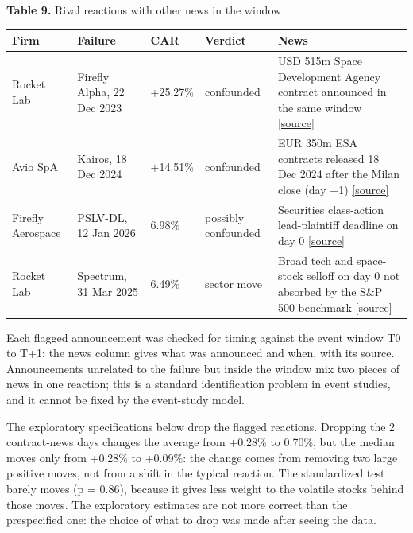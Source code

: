 \documentclass[12pt,a4paper]{article}
\begin{document}
\par\noindent\begin{minipage}{\textwidth}
\textbf{Table 9.} Rival reactions with other news in the window

{\small\setlength{\tabcolsep}{4pt}\begin{tabularx}{\textwidth}{lXllX}
\toprule
\textbf{Firm} & \textbf{Failure} & \textbf{CAR} & \textbf{Verdict} & \textbf{News} \\
\midrule
Rocket Lab & Firefly Alpha, 22 Dec 2023 & +25.27\% & confounded & USD 515m Space Development Agency contract announced in the same window \href{https://www.fool.com/investing/2023/12/22/why-rocket-lab-stock-is-going-to-the-moon-today}{[source]} \\
Avio SpA & Kairos, 18 Dec 2024 & +14.51\% & confounded & EUR 350m ESA contracts released 18 Dec 2024 after the Milan close (day +1) \href{https://www.emarketstorage.it/sites/default/files/comunicati/2024-12/20241218_158732.pdf}{[source]} \\
Firefly Aerospace & PSLV-DL, 12 Jan 2026 & \textminus{}6.98\% & possibly confounded & Securities class-action lead-plaintiff deadline on day 0 \href{https://finviz.com/news/268191/shareholders-of-firefly-aerospace-inc-should-contact-levi-korsinsky-before-january-12-2026-to-discuss-your-rights-fly}{[source]} \\
Rocket Lab & Spectrum, 31 Mar 2025 & \textminus{}6.49\% & sector move & Broad tech and space-stock selloff on day 0 not absorbed by the S\&P 500 benchmark \href{https://finviz.com/news/13588/why-rocket-lab-planet-labs-and-ast-spacemobile-stocks-all-dropped-on-monday}{[source]} \\
\bottomrule
\end{tabularx}}
\vspace{6pt}

\end{minipage}\par\vspace{4pt}

Each flagged announcement was checked for timing against the event window T0 to T+1: the news column gives what was announced and when, with its source. Announcements unrelated to the failure but inside the window mix two pieces of news in one reaction; this is a standard identification problem in event studies, and it cannot be fixed by the event-study model.

The exploratory specifications below drop the flagged reactions. Dropping the 2 contract-news days changes the average from +0.28\% to \textminus{}0.70\%, but the median moves only from +0.28\% to +0.09\%: the change comes from removing two large positive moves, not from a shift in the typical reaction. The standardized test barely moves (p = 0.86), because it gives less weight to the volatile stocks behind those moves. The exploratory estimates are not more correct than the prespecified one: the choice of what to drop was made after seeing the data.
\end{document}
